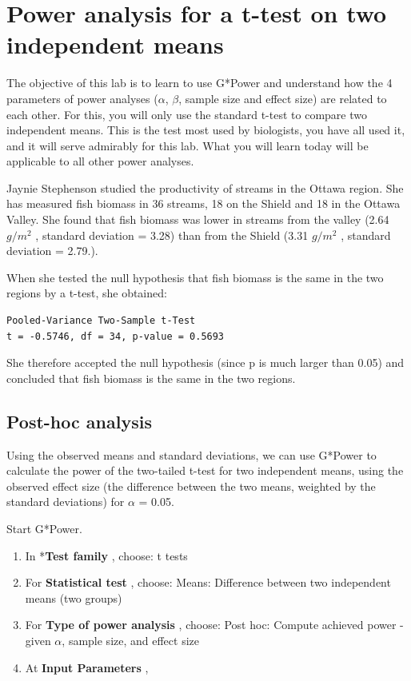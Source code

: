 \documentclass[
  12pt,
]{book}
\providecommand{\tightlist}{%
  \setlength{\itemsep}{0pt}\setlength{\parskip}{0pt}}
\begin{document}
\hypertarget{power-analysis-for-a-t-test-on-two-independent-means}{%
\section{Power analysis for a t-test on two independent means}\label{power-analysis-for-a-t-test-on-two-independent-means}}

The objective of this lab is to learn to use G*Power and understand how the 4 parameters of power analyses (\(\alpha\), \(\beta\), sample size and effect size) are related to each other. For this, you will only use the standard t-test to compare two independent means. This is the test most used by biologists, you have all used it, and it will serve admirably for this lab. What you will learn today will be applicable to all other power analyses.

Jaynie Stephenson studied the productivity of streams in the Ottawa region. She has measured fish biomass in 36 streams, 18 on the Shield and 18 in the Ottawa Valley. She found that fish biomass was lower in streams from the valley (2.64 \(g/m^2\) , standard deviation = 3.28) than from the Shield (3.31 \(g/m^2\) , standard deviation = 2.79.).

When she tested the null hypothesis that fish biomass is the same in the two regions by a t-test, she obtained:

\begin{verbatim}
Pooled-Variance Two-Sample t-Test
t = -0.5746, df = 34, p-value = 0.5693
\end{verbatim}

She therefore accepted the null hypothesis (since p is much larger than 0.05) and concluded that fish biomass is the same in the two regions.

\hypertarget{post-hoc-analysis}{%
\subsection{Post-hoc analysis}\label{post-hoc-analysis}}

Using the observed means and standard deviations, we can use G*Power to calculate the power of the two-tailed t-test for two independent means, using the observed effect size (the difference between the two means, weighted by the standard deviations) for \(\alpha\) = 0.05.

Start G*Power.

\begin{enumerate}
\def\labelenumi{\arabic{enumi}.}
\tightlist
\item
  In *\textbf{Test family} , choose: t tests
\item
  For \textbf{Statistical test} , choose: Means: Difference between two independent means (two groups)
\item
  For \textbf{Type of power analysis} , choose: Post hoc: Compute achieved power - given \(\alpha\), sample size, and effect size
\item
  At \textbf{Input Parameters} ,
\end{enumerate}
\end{document}
